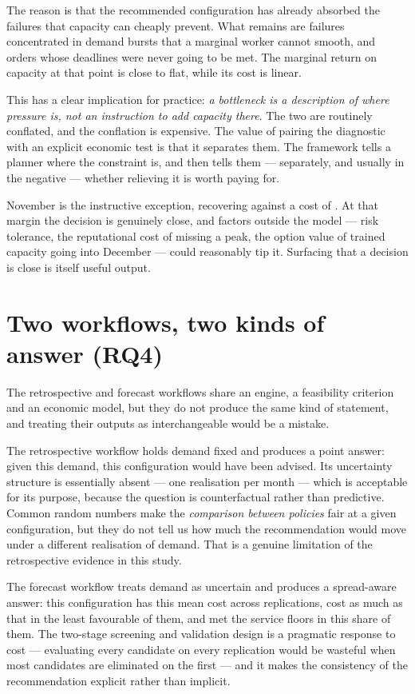 The reason is that the recommended configuration has already absorbed the failures that
capacity can cheaply prevent. What remains are failures concentrated in demand bursts that a
marginal worker cannot smooth, and orders whose deadlines were never going to be met. The
marginal return on capacity at that point is close to flat, while its cost is linear.

This has a clear implication for practice: \emph{a bottleneck is a description of where pressure
is, not an instruction to add capacity there}. The two are routinely conflated, and the
conflation is expensive. The value of pairing the diagnostic with an explicit economic test is
that it separates them. The framework tells a planner where the constraint is, and then tells
them --- separately, and usually in the negative --- whether relieving it is worth paying for.

November is the instructive exception, recovering  against a cost of . At
that margin the decision is genuinely close, and factors outside the model --- risk tolerance,
the reputational cost of missing a peak, the option value of trained capacity going into
December --- could reasonably tip it. Surfacing that a decision is close is itself useful
output.

\section{Two workflows, two kinds of answer (RQ4)}
\label{sec:disc-modes}

The retrospective and forecast workflows share an engine, a feasibility criterion and an
economic model, but they do not produce the same kind of statement, and treating their outputs
as interchangeable would be a mistake.

The retrospective workflow holds demand fixed and produces a point answer: given this demand,
this configuration would have been advised. Its uncertainty structure is essentially absent ---
one realisation per month --- which is acceptable for its purpose, because the question is
counterfactual rather than predictive. Common random numbers make the \emph{comparison between
policies} fair at a given configuration, but they do not tell us how much the recommendation
would move under a different realisation of demand. That is a genuine limitation of the
retrospective evidence in this study.

The forecast workflow treats demand as uncertain and produces a spread-aware answer: this
configuration has this mean cost across replications, cost as much as that in the least
favourable of them, and met the service floors in this share of them. The two-stage screening
and validation design is a pragmatic response to cost --- evaluating every candidate on every
replication would be wasteful when most candidates are eliminated on the first --- and it makes
the consistency of the recommendation explicit rather than implicit.

